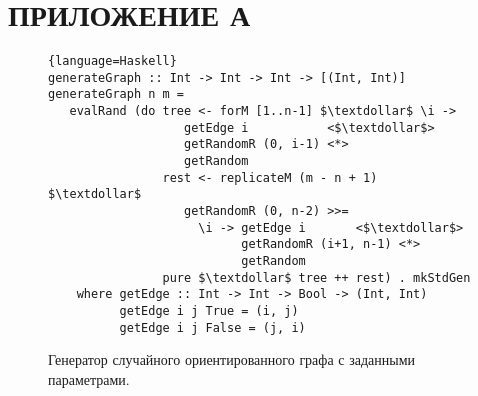 \section*{ПРИЛОЖЕНИЕ А}

%
%


\begin{figure}[h!]
\begin{lstlisting}{language=Haskell}
generateGraph :: Int -> Int -> Int -> [(Int, Int)]
generateGraph n m =
   evalRand (do tree <- forM [1..n-1] $\textdollar$ \i ->
                   getEdge i           <$\textdollar$>
                   getRandomR (0, i-1) <*>
                   getRandom
                rest <- replicateM (m - n + 1) $\textdollar$
                   getRandomR (0, n-2) >>=
                     \i -> getEdge i       <$\textdollar$>
                           getRandomR (i+1, n-1) <*>
                           getRandom
                pure $\textdollar$ tree ++ rest) . mkStdGen
    where getEdge :: Int -> Int -> Bool -> (Int, Int)
          getEdge i j True = (i, j)
          getEdge i j False = (j, i)
\end{lstlisting}
\caption{Генератор случайного ориентированного графа с заданными параметрами.}
\label{fig:graphGen}
\end{figure}
